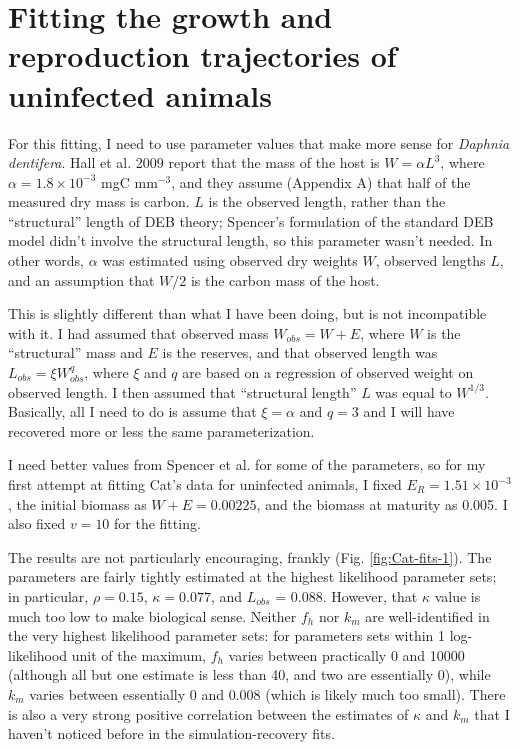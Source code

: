 \documentclass[12pt,reqno,final,pdftex]{amsart}\usepackage[]{graphicx}\usepackage[]{color}
\theoremstyle{plain}
\numberwithin{equation}{part}
\begin{document}
\section*{Fitting the growth and reproduction trajectories of uninfected animals}
For this fitting, I need to use parameter values that make more sense for \emph{Daphnia dentifera}.
Hall et al. 2009 report that the mass of the host is $W=\alpha L^3$, where $\alpha=1.8\times 10^{-3}$ mgC mm$^{-3}$, and they assume (Appendix A) that half of the measured dry mass is carbon.
$L$ is the observed length, rather than the ``structural'' length of DEB theory; Spencer's formulation of the standard DEB model didn't involve the structural length, so this parameter wasn't needed.
In other words, $\alpha$ was estimated using observed dry weights $W$, observed lengths $L$, and an assumption that $W/2$ is the carbon mass of the host.

This is slightly different than what I have been doing, but is not incompatible with it.
I had assumed that observed mass $W_{obs} = W + E$, where $W$ is the ``structural'' mass and $E$ is the reserves, and that observed length was $L_{obs} = \xi W_{obs}^q$, where $\xi$ and $q$ are based on a regression of observed weight on observed length.
I then assumed that ``structural length'' $L$ was equal to $W^{1/3}$.
Basically, all I need to do is assume that $\xi=\alpha$ and $q=3$ and I will have recovered more or less the same parameterization.

I need better values from Spencer et al. for some of the parameters, so for my first attempt at fitting Cat's data for uninfected animals, I fixed $E_R = 1.51 \times 10^{-3}$, the initial biomass as $W+E = 0.00225$, and the biomass at maturity as 0.005.
I also fixed $v=10$ for the fitting.

The results are not particularly encouraging, frankly (Fig. \ref{fig:Cat-fits-1}).
The parameters are fairly tightly estimated at the highest likelihood parameter sets; in particular, $\rho=0.15$, $\kappa=0.077$, and $L_{obs}$ = 0.088.
However, that $\kappa$ value is much too low to make biological sense.
Neither $f_h$ nor $k_m$ are well-identified in the very highest likelihood parameter sets: for parameters sets within 1 log-likelihood unit of the maximum, $f_h$ varies between practically 0 and 10000 (although all but one estimate is less than 40, and two are essentially 0), while $k_m$ varies between essentially 0 and 0.008 (which is likely much too small).
There is also a very strong positive correlation between the estimates of $\kappa$ and $k_m$ that I haven't noticed before in the simulation-recovery fits.
\end{document}
